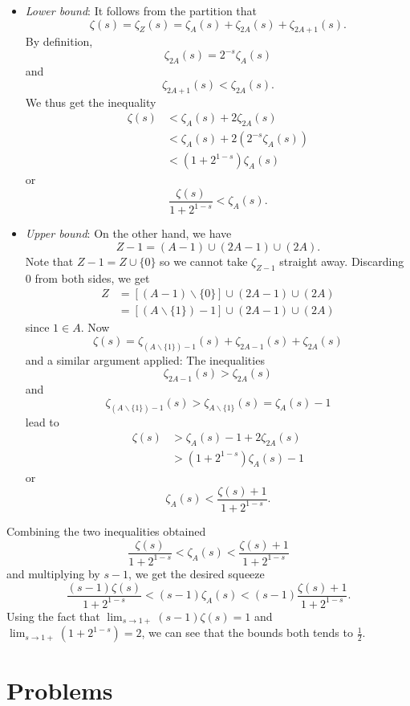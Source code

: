 \documentclass{article}
\begin{document}
\begin{itemize}
\item \emph{Lower bound}: It follows from the partition that
$$\zeta(s) = \zeta_Z(s) = \zeta_A(s) + \zeta_{2A}(s) + \zeta_{2A+1}(s).$$
By definition,
$$\zeta_{2A}(s) = 2^{-s} \zeta_A(s)$$
and
$$\zeta_{2A+1}(s) < \zeta_{2A}(s).$$
We thus get the inequality
\begin{align*}
\zeta(s) &< \zeta_A(s) + 2 \zeta_{2A}(s)\\
&< \zeta_A(s) + 2 (2^{-s} \zeta_A(s))\\
&< (1 + 2^{1-s}) \zeta_A(s)
\end{align*}
or
$$\frac{\zeta(s)}{1 + 2^{1-s}} < \zeta_A(s).$$

\item \emph{Upper bound}: On the other hand, we have
$$Z - 1 = (A - 1) \cup (2A - 1) \cup (2A).$$
Note that $Z - 1 = Z \cup \{0\}$ so we cannot take $\zeta_{Z - 1}$ straight away.
Discarding 0 from both sides, we get
\begin{align*}
Z &= [(A - 1) \backslash \{0\}] \cup (2A - 1) \cup (2A)\\
&= [(A \backslash \{1\}) - 1] \cup (2A - 1) \cup (2A)
\end{align*}
since $1 \in A$. Now
$$\zeta(s) = \zeta_{(A \backslash \{1\}) - 1}(s) + \zeta_{2A - 1}(s) + \zeta_{2A}(s)$$
and a similar argument applied: The inequalities
$$\zeta_{2A - 1}(s) > \zeta_{2A}(s)$$
and
$$\zeta_{(A \backslash \{1\}) - 1}(s) > \zeta_{A \backslash \{1\}}(s) = \zeta_A(s) - 1$$
lead to
\begin{align*}
\zeta(s) &> \zeta_A(s) - 1 + 2 \zeta_{2A}(s)\\
&> (1 + 2^{1-s}) \zeta_A(s) - 1
\end{align*}
or
$$\zeta_A(s) < \frac{\zeta(s) + 1}{1 + 2^{1-s}}.$$
\end{itemize}

Combining the two inequalities obtained
$$\frac{\zeta(s)}{1 + 2^{1-s}} < \zeta_A(s) < \frac{\zeta(s) + 1}{1 + 2^{1-s}}$$
and multiplying by $s - 1$, we get the desired squeeze
$$\frac{(s - 1) \zeta(s)}{1 + 2^{1-s}} < (s - 1) \zeta_A(s) < (s - 1) \frac{\zeta(s) + 1}{1 + 2^{1-s}}.$$
Using the fact that $\lim_{s \rightarrow 1+} (s - 1) \zeta(s) = 1$ and $\lim_{s \rightarrow 1+} (1 + 2^{1-s}) = 2$, we can see that the bounds both tends to $\frac{1}{2}$.

\section{Problems}
\end{document}
